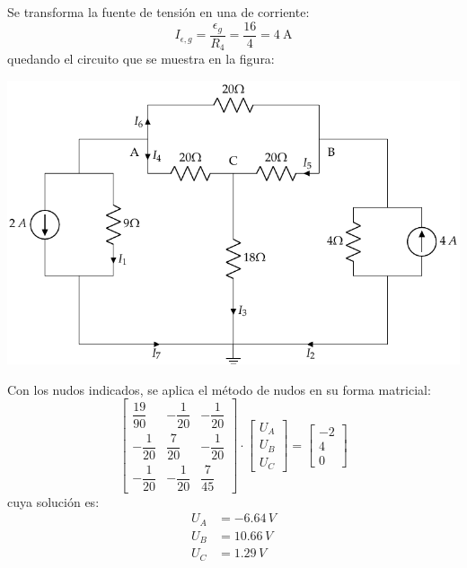      Se transforma la fuente de tensión en una de corriente:
     \begin{equation*}
       I_{\epsilon,g}=\dfrac{\epsilon_g}{R_4}=\dfrac{16}{4}=\qty{4}{\ampere}
     \end{equation*}
     quedando el circuito que se muestra en la figura:
     \begin{center}
       \includegraphics{figuras/BT1_12_nudos.pdf}
     \end{center}
     Con los nudos indicados, se aplica el método de nudos en su forma
     matricial:
     \begin{equation*}
       \begin{bmatrix}
         \dfrac{19}{90} & -\dfrac{1}{20} & -\dfrac{1}{20}\\[10pt]
         -\dfrac{1}{20} & \dfrac{7}{20} & -\dfrac{1}{20}\\[10pt]
         -\dfrac{1}{20} & -\dfrac{1}{20} & \dfrac{7}{45}
       \end{bmatrix}
       \cdot
       \begin{bmatrix}
         U_A\\
         U_B\\
         U_C
       \end{bmatrix}
       =
       \begin{bmatrix}
         -2\\
         4\\
         0
       \end{bmatrix}
     \end{equation*}
     cuya solución es:
     \begin{align*}
       U_A&=-6.64\,V\\
       U_B&=10.66\,V\\
       U_C&=1.29\,V\\
     \end{align*}

